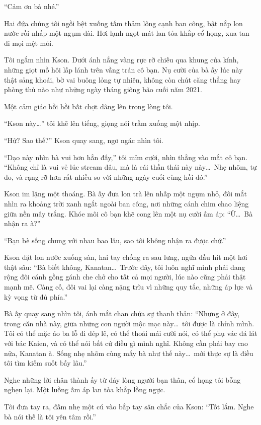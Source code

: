\documentclass[../main.tex]{subfiles}
\begin{document}
``Cảm ơn bà nhé.''

Hai đứa chúng tôi ngồi bệt xuống tấm thảm lông cạnh ban công, bật nắp lon nước rồi nhấp một ngụm dài. Hơi lạnh ngọt mát lan tỏa khắp cổ họng, xua tan đi mọi mệt mỏi.

Tôi ngắm nhìn Kson. Dưới ánh nắng vàng rực rỡ chiếu qua khung cửa kính, những giọt mồ hôi lấp lánh trên vầng trán cô bạn. Nụ cười của bà ấy lúc này thật sảng khoái, bờ vai buông lỏng tự nhiên, không còn chút căng thẳng hay phòng thủ nào như những ngày tháng giông bão cuối năm 2021.

Một cảm giác bồi hồi bất chợt dâng lên trong lòng tôi.

``Kson này\dots'' tôi khẽ lên tiếng, giọng nói trầm xuống một nhịp.

``Hử? Sao thế?'' Kson quay sang, ngơ ngác nhìn tôi.

``Dạo này nhìn bà vui hơn hẳn đấy,'' tôi mỉm cười, nhìn thẳng vào mắt cô bạn. ``Không chỉ là vui vẻ lúc stream đâu, mà là cái thần thái này này\dots\ Nhẹ nhõm, tự do, và rạng rỡ hơn rất nhiều so với những ngày cuối cùng hồi đó.''

Kson im lặng một thoáng. Bà ấy đưa lon trà lên nhấp một ngụm nhỏ, đôi mắt nhìn ra khoảng trời xanh ngắt ngoài ban công, nơi những cánh chim chao liệng giữa nền mây trắng. Khóe môi cô bạn khẽ cong lên một nụ cười ấm áp: ``Ừ\dots\ Bà nhận ra à?''

``Bạn bè sống chung với nhau bao lâu, sao tôi không nhận ra được chứ.''

Kson đặt lon nước xuống sàn, hai tay chống ra sau lưng, ngửa đầu hít một hơi thật sâu: ``Bà biết không, Kanatan\dots\ Trước đây, tôi luôn nghĩ mình phải dang rộng đôi cánh gồng gánh che chở cho tất cả mọi người, lúc nào cũng phải thật mạnh mẽ. Càng cố, đôi vai lại càng nặng trĩu vì những quy tắc, những áp lực và kỳ vọng từ đủ phía.''

Bà ấy quay sang nhìn tôi, ánh mắt chan chứa sự thanh thản: ``Nhưng ở đây, trong căn nhà này, giữa những con người mộc mạc này\dots\ tôi được là chính mình. Tôi có thể mặc áo ba lỗ đi dép lê, có thể thoải mái cười nói, có thể phụ vác đá lát với bác Kaien, và có thể nói bất cứ điều gì mình nghĩ. Không cần phải bay cao nữa, Kanatan à. Sống nhẹ nhõm cùng mấy bà như thế này\dots\ mới thực sự là điều tôi tìm kiếm suốt bấy lâu.''

Nghe những lời chân thành ấy từ đáy lòng người bạn thân, cổ họng tôi bỗng nghẹn lại. Một luồng ấm áp lan tỏa khắp lồng ngực.

Tôi đưa tay ra, đấm nhẹ một cú vào bắp tay săn chắc của Kson: ``Tốt lắm. Nghe bà nói thế là tôi yên tâm rồi.''
\end{document}
